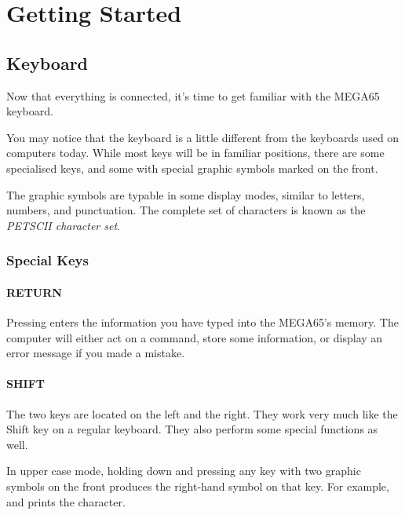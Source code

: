 \chapter{Getting Started}
\hypersetup{bookmarksdepth=5}

\section{Keyboard}
\label{cha:getting-started}

Now that everything is connected, it's time to get familiar with the MEGA65 keyboard.

You may notice that the keyboard is a little different from the keyboards used on computers today. While most keys will be in familiar positions, there are some specialised keys, and some with special graphic symbols marked on the front.

The graphic symbols are typable in some display modes, similar to letters, numbers, and punctuation. The complete set of characters is known as the {\em PETSCII character set}.

\subsection{Special Keys}

\subsubsection{RETURN}
Pressing  enters the information you have typed into the MEGA65's memory. The computer will either act on a command, store some information, or display an error message if you made a mistake.

\subsubsection{SHIFT}
The two  keys are located on the left and the right. They work very much like the Shift key on a regular keyboard. They also perform some special functions as well.

In upper case mode, holding down  and pressing any key with two graphic symbols on the front produces the right-hand symbol on that key. For example,  and  prints the  character.

